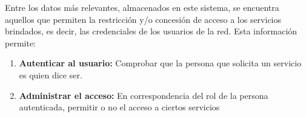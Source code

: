 Entre los datos m\'as relevantes, almacenados en este sistema, se encuentra aquellos que permiten la restricci\'on y/o concesi\'on de acceso a los servicios brindados, es decir, las credenciales de los usuarios de la red. Esta informaci\'on permite:

\begin{enumerate}
\item {\bf Autenticar al usuario:} Comprobar que la persona que solicita un servicio es quien dice ser.
\item {\bf Administrar el acceso:} En correspondencia del rol de la persona autenticada, permitir o no el acceso a ciertos servicios
\end{enumerate}
   